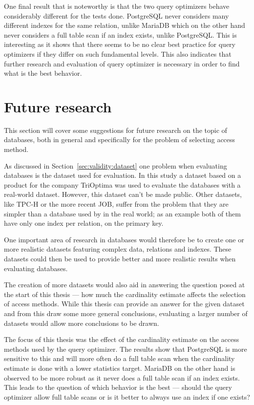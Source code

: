 One final result that is noteworthy is that the two query optimizers behave
considerably different for the tests done. PostgreSQL never considers
many different indexes for the same relation, unlike MariaDB which on the other
hand never considers a full table scan if an index exists, unlike PostgreSQL.\@
This is interesting as it shows that there seems to be no clear best practice
for query optimizers if they differ on such fundamental levels. This also
indicates that further research and evaluation of query optimizer is necessary
in order to find what is the best behavior.

\section{Future research}\label{sec:futureresearch}
This section will cover some suggestions for future research on the topic of
databases, both in general and specifically for the problem of selecting access method.

As discussed in Section~\ref{sec:validity:dataset} one problem when evaluating
databases is the dataset used for evaluation. In this study a dataset based on a
product for the company TriOptima was used to evaluate the databases with a real-world
dataset. However, this dataset can't be made public. Other datasets, like TPC-H
or the more recent JOB, suffer from the problem that they are simpler
than a database used by in the real world; as an example both of them have only one
index per relation, on the primary key.

One important area of research in databases would therefore be to create one or
more realistic datasets featuring complex data, relations and indexes.
These datasets could then be used to provide better and more realistic results
when evaluating databases.

The creation of more datasets would also aid in answering the question posed at
the start of this thesis --- how much the cardinality estimate affects the selection
of access methods. While this thesis can provide an answer for the given dataset
and from this draw some more general conclusions, evaluating a larger number of
datasets would allow more conclusions to be drawn.

The focus of this thesis was the effect of the cardinality estimate on the
access methods used by the query optimizer. The results show that PostgreSQL is
more sensitive to this and will more often do a full table scan when the
cardinality estimate is done with a lower statistics target. MariaDB on the
other hand is observed to be more robust as it never does a full table scan if
an index exists. This leads to the question of which behavior is the best ---
should the query optimizer allow full table scans or is it better to always use
an index if one exists?

